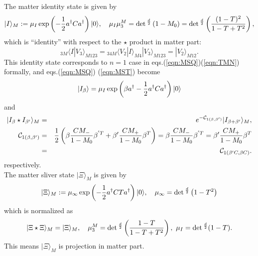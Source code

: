 \documentclass[12pt,a4paper]{article}
\begin{document}
The matter identity state is given by
\begin{equation}
|I\rangle_M:=\mu_I\exp\left(-{1\over2}a^\dagger Ca^\dagger\right)|0\rangle,\ \ \ 
\mu_I\mu_3^M=\det{}^{d\over2}\left(1-M_0\right)=\det{}^{d\over2}\left({(1-T)^2\over1-T+T^2}\right),
\end{equation}
which is ``identity'' with respect to the $\star$ product in matter part:
\begin{equation}
{}_{3M}\langle I|V_3\rangle_{M123}={}_{34M}\langle V_2|I\rangle_{M4}|V_3\rangle_{M123}=|V_2\rangle_{M12}.
\end{equation}
This identity state corresponds to $n=1$ case in eqs.(\ref{eqn:MSQ})(\ref{eqn:TMN}) formally, and eqs.(\ref{eqn:MSQ}) (\ref{eqn:MST}) become
\begin{equation}
\label{eqn:IBETA}
|I_\beta\rangle=\mu_I\exp\left(\beta a^\dagger-{1\over2}a^\dagger Ca^\dagger\right)|0\rangle 
\end{equation}
and
\begin{eqnarray}
|I_\beta\star I_{\beta'}\rangle_M&=&e^{-{\cal C}_{1(\beta,\beta')}}|I_{\beta+\beta'}\rangle_M,\nonumber \\
{\cal C}_{1(\beta,\beta')}&=&{1\over2}\left(\beta{CM_-\over1-M_0}\beta^{'T}+\beta'{CM_+\over1-M_0}\beta^T\right)=\beta{CM_-\over1-M_0}\beta^{'T}=\beta'{CM_+\over1-M_0}\beta^T\nonumber \\
&=&{\cal C}_{1(\beta'C,\beta C)}.
\end{eqnarray}
respectively.\\


The matter sliver state $|\Xi\rangle_M$ is given by
\begin{equation}
|\Xi\rangle_M:=\mu_\infty \exp\left(-{1\over2}a^\dagger CTa^\dagger\right)|0\rangle,\ \ \ \mu_\infty=\det{}^{d\over2}\left(1-T^2\right)
\end{equation}
which is normalized as
\begin{equation}
|\Xi\star\Xi\rangle_M=|\Xi\rangle_M,\ \ \ \mu_3^M=\det{}^{d\over2}\left({1-T\over1-T+T^2}\right),\ \mu_I=\det{}^{d\over2}(1-T).
\end{equation}
This means $|\Xi\rangle_M$ is projection in matter part.
\end{document}

